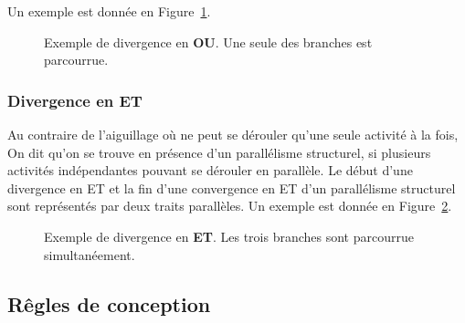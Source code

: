  Un exemple est donnée en Figure~\ref{fig:divOU}.


\begin{figure}[ht]
  \centering
  
  \caption{Exemple de divergence en \textbf{OU}. Une seule des branches est parcourrue.}
  \label{fig:divOU}
\end{figure}


\subsubsection{Divergence en ET}
Au contraire de l'aiguillage où ne peut se dérouler qu'une seule activité à la fois, On dit qu'on se trouve en présence d'un parallélisme structurel, si plusieurs activités indépendantes pouvant se dérouler en parallèle. Le début d'une divergence en ET et la fin d'une convergence en ET d'un parallélisme structurel sont représentés par deux traits parallèles. Un exemple est donnée en Figure~\ref{fig:divET}.

\begin{figure}
  \centering
  
  \caption{Exemple de divergence en \textbf{ET}. Les trois branches sont parcourrue simultanéement.}
  \label{fig:divET}
\end{figure}

\subsection{Rêgles de conception}

